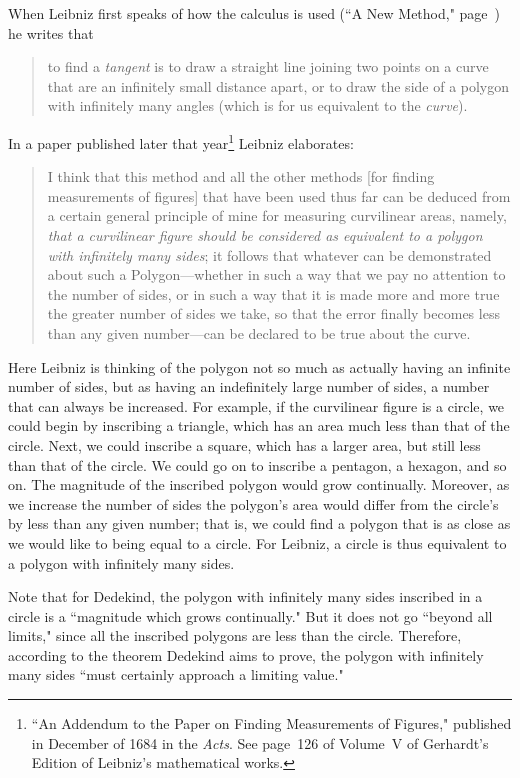 \documentclass[twoside,openright]{article}
\begin{document}
When Leibniz first speaks of how the calculus is used (``A New
Method," page\ \pageref{taninfcl}) he writes that
\begin{quote}
  to find a {\em tangent} is to draw a straight line joining two
  points on a curve that are an infinitely small distance apart, or to
  draw the side of a polygon with infinitely many angles (which is for
  us equivalent to the {\em curve}).
\end{quote}
In a paper published later that year\footnote{``An Addendum to the
  Paper on Finding Measurements of Figures," published in December of
  1684 in the {\em Acts}.  See page~126 of Volume~V of Gerhardt's
  Edition of Leibniz's mathematical works.} Leibniz elaborates:
\begin{quote}
  I think that this method and all the other methods [for finding
  measurements of figures] that have been used thus far can be deduced
  from a certain general principle of mine for measuring curvilinear
  areas, namely, {\em that a curvilinear figure should be considered
    as equivalent to a polygon with infinitely many sides}; it follows
  that whatever can be demonstrated about such a Polygon---whether
  in such a way that we pay no attention to the number of sides, or in
  such a way that it is made more and more true the greater number of
  sides we take, so that the error finally becomes less than any given
  number---can be declared to be true about the curve.
\end{quote}
Here Leibniz is thinking of the polygon not so much as actually having
an infinite number of sides, but as having an indefinitely large
number of sides, a number that can always be increased.  For example,
if the curvilinear figure is a circle, we could begin by inscribing a
triangle, which has an area much less than that of the circle.  Next,
we could inscribe a square, which has a larger area, but still less
than that of the circle.  We could go on to inscribe a pentagon, a
hexagon, and so on.  The magnitude of the inscribed polygon would grow
continually.  Moreover, as we increase the number of sides the
polygon's area would differ from the circle's by less than any given
number; that is, we could find a polygon that is as close as we would
like to being equal to a circle.  For Leibniz, a circle is thus
equivalent to a polygon with infinitely many sides.

Note that for Dedekind, the polygon with infinitely many sides
inscribed in a circle is a ``magnitude which grows continually."  But
it does not go ``beyond all limits," since all the inscribed polygons
are less than the circle.  Therefore, according to the theorem
Dedekind aims to prove, the polygon with infinitely many sides ``must
certainly approach a limiting value."
\end{document}

